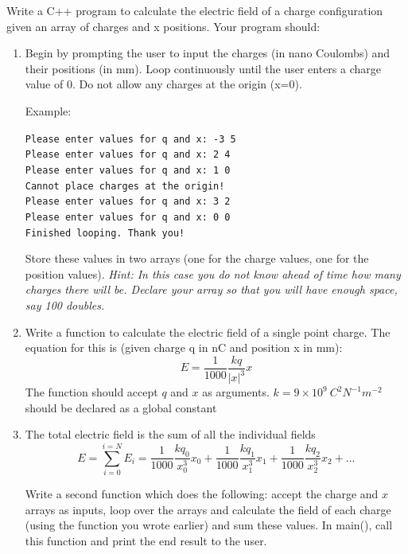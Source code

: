 \documentclass{article}
\begin{document}
Write a C++ program to calculate the electric field of a charge configuration given an array of charges and x positions. Your program should:
\begin{enumerate}
	\item Begin by prompting the user to input the charges (in nano Coulombs) and their positions (in mm). Loop continuously until the user enters a charge value of 0. Do not allow any charges at the origin (x=0).
	
	Example:
	
	\texttt{Please enter values for q and x: -3 5}\\
	\texttt{Please enter values for q and x: 2 4}\\
	\texttt{Please enter values for q and x: 1 0}\\
	\texttt{Cannot place charges at the origin!}\\
	\texttt{Please enter values for q and x: 3 2}\\
	\texttt{Please enter values for q and x: 0 0}\\
	\texttt{Finished looping. Thank you!}
	
	Store these values in two arrays (one for the charge values, one for the position values).  \textit{Hint: In this case you do not know ahead of time how many charges there will be. Declare your array so that you will have enough space, say 100 doubles.}
	
	\item Write a function to calculate the electric field of a single point charge. The equation for this is (given charge q in nC and position x in mm):
	\begin{equation*}
		E = \frac{1}{1000}\frac{kq}{|x|^3}x
	\end{equation*}
	The function should accept $q$ and $x$ as arguments. $k=9\times10^9 \ C^2N^{-1}m^{-2}$ should be declared as a global constant
	
	\item
	The total electric field is the sum of all the individual fields
	\begin{equation*}
		E = \sum_{i=0}^{i=N}E_i=\frac{1}{1000}\frac{kq_0}{x_0^3}x_0 + \frac{1}{1000}\frac{kq_1}{x_1^3}x_1 + \frac{1}{1000}\frac{kq_2}{x_2^3}x_2 + ...
	\end{equation*}
	
	Write a second function which does the following: accept the charge and $x$ arrays as inputs, loop over the arrays and calculate the field of each charge (using the function you wrote earlier) and sum these values. In main(), call this function and print the end result to the user.
\end{enumerate}
\end{document}
